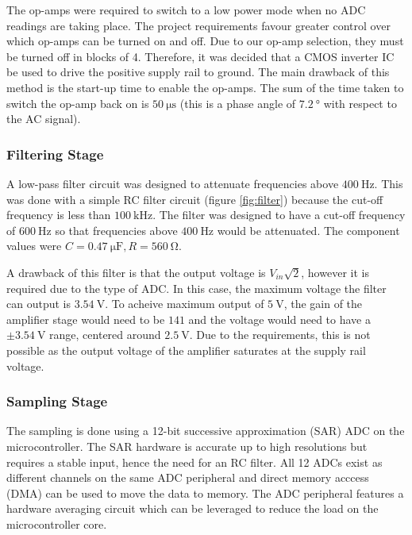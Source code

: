 The op-amps were required to switch to a low power mode when no ADC readings are taking place.
The project requirements favour greater control over which op-amps can be turned on and off.
Due to our op-amp selection, they must be turned off in blocks of 4.
Therefore, it was decided that a CMOS inverter IC be used to drive the positive supply rail to ground.
The main drawback of this method is the start-up time to enable the op-amps.
The sum of the time taken to switch the op-amp back on is $\SI{50}{\micro\second}$ (this is a phase angle of $\SI{7.2}{\degree}$ with respect to the AC signal).

\subsubsection{Filtering Stage}

A low-pass filter circuit was designed to attenuate frequencies above $\SI{400}{\hertz}$.
This was done with a simple RC filter circuit (figure \ref{fig:filter}) because the cut-off frequency is less than $\SI{100}{\kilo\hertz}$.
The filter was designed to have a cut-off frequency of $\SI{600}{\hertz}$ so that frequencies above $\SI{400}{\hertz}$ would be attenuated.
The component values were $C = \SI{0.47}{\micro\farad}, R = \SI{560}{\ohm}$.

A drawback of this filter is that the output voltage is $V_{in} \sqrt{2}$, however it is required due to the type of ADC.
In this case, the maximum voltage the filter can output is $\SI{3.54}{\volt}$.
To acheive maximum output of $\SI{5}{\volt}$, the gain of the amplifier stage would need to be $141$ and the voltage would need to have a $\pm\SI{3.54}{\volt}$ range, centered around $\SI{2.5}{\volt}$.
Due to the requirements, this is not possible as the output voltage of the amplifier saturates at the supply rail voltage.

\subsubsection{Sampling Stage}

The sampling is done using a 12-bit successive approximation (SAR) ADC on the microcontroller.
The SAR hardware is accurate up to high resolutions but requires a stable input, hence the need for an RC filter.
All 12 ADCs exist as different channels on the same ADC peripheral and direct memory acccess (DMA) can be used to move the data to memory.
The ADC peripheral features a hardware averaging circuit which can be leveraged to reduce the load on the microcontroller core.


